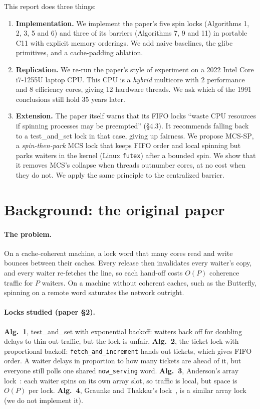 \documentclass[10pt,twocolumn]{article}
\newcommand{\mcssp}{\textsc{MCS-SP}}
\begin{document}
This report does three things:
\begin{enumerate}\setlength\itemsep{0pt}
\item \textbf{Implementation.} We implement the paper's five spin locks (Algorithms 1, 2, 3, 5 and 6) and
three of its barriers (Algorithms 7, 9 and 11) in portable C11 with explicit memory orderings. We add
naive baselines, the glibc primitives, and a cache-padding ablation.
\item \textbf{Replication.} We re-run the paper's style of experiment on a 2022 Intel Core i7-1255U
laptop CPU. This CPU is a \emph{hybrid} multicore with 2 performance and 8 efficiency cores, giving 12
hardware threads. We ask which of the 1991 conclusions still hold 35 years later.
\item \textbf{Extension.} The paper itself warns that its FIFO locks ``waste CPU resources if spinning
processes may be preempted'' (\S4.3). It recommends falling back to a test\_and\_set lock in that
case, giving up fairness. We propose \mcssp{}, a \emph{spin-then-park} MCS lock that keeps FIFO order
and local spinning but parks waiters in the kernel (Linux \texttt{futex}) after a bounded spin. We show
that it removes MCS's collapse when threads outnumber cores, at no cost when they do not. We apply the
same principle to the centralized barrier.
\end{enumerate}

\section{Background: the original paper}
\label{sec:background}
\paragraph{The problem.} On a cache-coherent machine, a lock word that many cores read and write
bounces between their caches. Every release then invalidates every waiter's copy, and every waiter
re-fetches the line, so each hand-off costs $O(P)$ coherence traffic for $P$ waiters. On a machine
without coherent caches, such as the Butterfly, spinning on a remote word saturates the network outright.

\paragraph{Locks studied (paper \S2).}
\textbf{Alg.~1}, test\_and\_set with exponential backoff: waiters back off for doubling delays to thin out
traffic, but the lock is unfair. \textbf{Alg.~2}, the ticket lock with proportional backoff:
\texttt{fetch\_and\_increment} hands out tickets, which gives FIFO order. A waiter delays in proportion to how
many tickets are ahead of it, but everyone still polls one shared \texttt{now\_serving} word.
\textbf{Alg.~3}, Anderson's array lock~\cite{anderson90}: each waiter spins on its own array slot,
so traffic is local, but space is $O(P)$ per lock. \textbf{Alg.~4}, Graunke and Thakkar's
lock~\cite{gt90}, is a similar array lock (we do not implement it).
\end{document}
